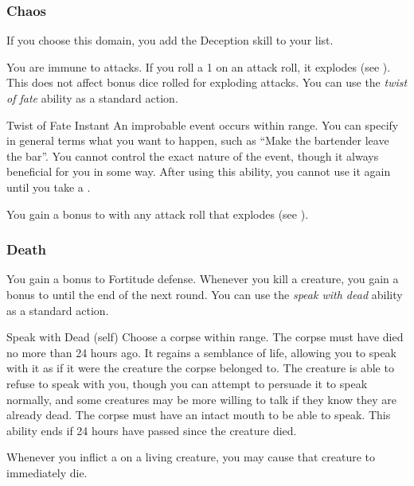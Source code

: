         \subsubsection{Chaos}
            If you choose this domain, you add the Deception skill to your  list.

             You are immune to  attacks.
             If you roll a 1 on an attack roll, it explodes (see ).
            This does not affect bonus dice rolled for exploding attacks.
             You can use the \textit{twist of fate} ability as a standard action.
            \begin{instantability}{Twist of Fate}
                Instant
                \rankline
                An improbable event occurs within \rnglong range.
                You can specify in general terms what you want to happen, such as ``Make the bartender leave the bar''.
                You cannot control the exact nature of the event, though it always beneficial for you in some way.
                After using this ability, you cannot use it again until you take a .
            \end{instantability}
             You gain a  bonus to  with any attack roll that explodes (see ).

        \subsubsection{Death}
             You gain a  bonus to Fortitude defense.
             Whenever you kill a creature, you gain a  bonus to  until the end of the next round.
             You can use the \textit{speak with dead} ability as a standard action.
            \begin{attuneability}{Speak with Dead}
                 (self)
                \rankline
                Choose a corpse within \rngshort range.
                The corpse must have died no more than 24 hours ago.
                It regains a semblance of life, allowing you to speak with it as if it were the creature the corpse belonged to.
                The creature is able to refuse to speak with you, though you can attempt to persuade it to speak normally, and some creatures may be more willing to talk if they know they are already dead.
                The corpse must have an intact mouth to be able to speak.
                This ability ends if 24 hours have passed since the creature died.
            \end{attuneability}
             Whenever you inflict a  on a living creature, you may cause that creature to immediately die.

